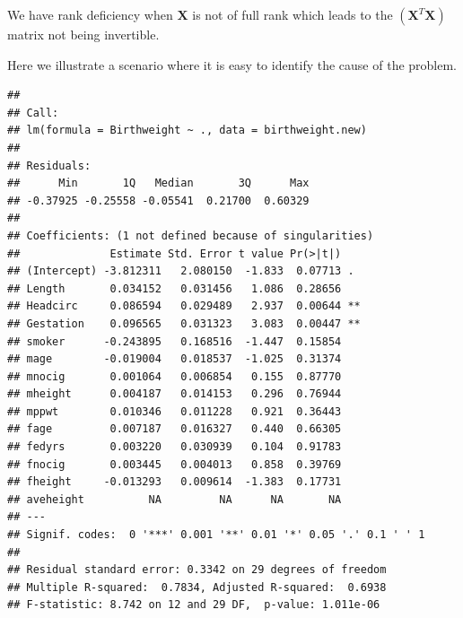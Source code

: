 \documentclass[
]{book}
\newenvironment{Shaded}{\begin{snugshade}}{\end{snugshade}}
\newcommand{\AttributeTok}[1]{\textcolor[rgb]{0.13,0.29,0.53}{#1}}
\newcommand{\DecValTok}[1]{\textcolor[rgb]{0.00,0.00,0.81}{#1}}
\newcommand{\DocumentationTok}[1]{\textcolor[rgb]{0.56,0.35,0.01}{\textbf{\textit{#1}}}}
\newcommand{\FunctionTok}[1]{\textcolor[rgb]{0.13,0.29,0.53}{\textbf{#1}}}
\newcommand{\NormalTok}[1]{#1}
\newcommand{\OtherTok}[1]{\textcolor[rgb]{0.56,0.35,0.01}{#1}}
\newcommand{\SpecialCharTok}[1]{\textcolor[rgb]{0.81,0.36,0.00}{\textbf{#1}}}
\begin{document}
We have rank deficiency when \(\mathbf{X}\) is not of full rank which leads to the \((\mathbf{X}^T\mathbf{X})\) matrix not being invertible.

Here we illustrate a scenario where it is easy to identify the cause of the problem.

\begin{Shaded}
\end{Shaded}

\begin{verbatim}
## 
## Call:
## lm(formula = Birthweight ~ ., data = birthweight.new)
## 
## Residuals:
##      Min       1Q   Median       3Q      Max 
## -0.37925 -0.25558 -0.05541  0.21700  0.60329 
## 
## Coefficients: (1 not defined because of singularities)
##              Estimate Std. Error t value Pr(>|t|)   
## (Intercept) -3.812311   2.080150  -1.833  0.07713 . 
## Length       0.034152   0.031456   1.086  0.28656   
## Headcirc     0.086594   0.029489   2.937  0.00644 **
## Gestation    0.096565   0.031323   3.083  0.00447 **
## smoker      -0.243895   0.168516  -1.447  0.15854   
## mage        -0.019004   0.018537  -1.025  0.31374   
## mnocig       0.001064   0.006854   0.155  0.87770   
## mheight      0.004187   0.014153   0.296  0.76944   
## mppwt        0.010346   0.011228   0.921  0.36443   
## fage         0.007187   0.016327   0.440  0.66305   
## fedyrs       0.003220   0.030939   0.104  0.91783   
## fnocig       0.003445   0.004013   0.858  0.39769   
## fheight     -0.013293   0.009614  -1.383  0.17731   
## aveheight          NA         NA      NA       NA   
## ---
## Signif. codes:  0 '***' 0.001 '**' 0.01 '*' 0.05 '.' 0.1 ' ' 1
## 
## Residual standard error: 0.3342 on 29 degrees of freedom
## Multiple R-squared:  0.7834, Adjusted R-squared:  0.6938 
## F-statistic: 8.742 on 12 and 29 DF,  p-value: 1.011e-06
\end{verbatim}
\end{document}
